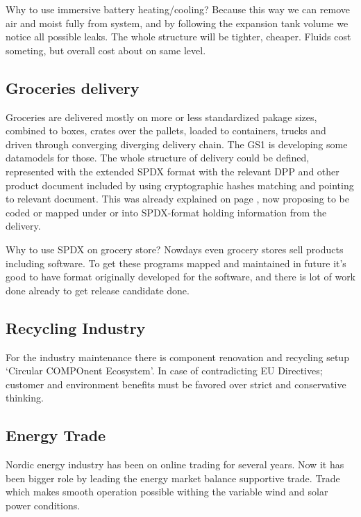Why to use immersive battery heating/cooling? Because this way we can remove
air and moist fully from system, and by following the expansion tank volume
we notice all possible leaks. The whole structure will be tighter, cheaper.
Fluids cost someting, but overall cost about on same level.

\subsection{Groceries delivery}\label{groceries_delivery}

Groceries are delivered mostly on more or less standardized pakage sizes,
combined to boxes, crates over the pallets, loaded to containers, trucks
and driven through converging diverging delivery chain. The GS1 is
developing some datamodels\allowbreak\cite{GS1Development} for those.
The whole structure of delivery could be defined, represented with the 
extended SPDX format with the relevant DPP and other product document
included  by using cryptographic hashes matching and pointing to relevant
document. This was already explained on page
\pageref{improvement_1D_2D_RFID_usage}, now proposing to be coded or
mapped under or into SPDX-format holding information from the delivery.

Why to use SPDX on grocery store? Nowdays even grocery stores sell
products including software. To get these programs mapped and maintained
in future it's good to have format originally developed for the software,
and there is lot of work done already to get release
candidate\allowbreak\cite{SPDX} done.

\subsection{Recycling Industry}\label{recycling_industry}
For the industry maintenance there is component renovation and recycling
setup `Circular COMPOnent Ecosystem'\allowbreak\cite{COMPO}. In case of
contradicting EU Directives; customer and environment benefits must be
favored\allowbreak\cite{E-003469_2026_ASW} over strict and conservative
thinking\allowbreak\cite{EvBatBackBalancedRepairing}.

\subsection{Energy Trade}\label{energy_trade}

Nordic energy industry has been on online trading\allowbreak\cite{
NordPoolTrading} for several years. Now it has been bigger role by leading
the energy market balance supportive trade\allowbreak\cite{FinGridDataHub}.
Trade which makes smooth operation possible withing the variable wind and
solar power conditions.

